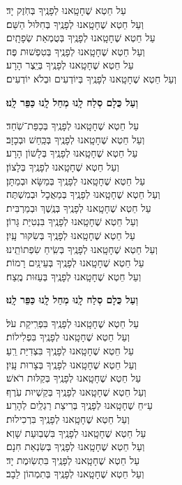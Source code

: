 \documentclass[twoside, openany, parskip=half, 11pt]{book}
\begin{document}
עַל חֵטְא שֶׁחָטָֽאנוּ לְפָנֶֽיךָ בְּחֹֽזֶק יָד׃ \\ וְעַל חֵטְא שֶׁחָטָֽאנוּ לְפָנֶֽיךָ בְּחִלּוּל הַשֵּׁם׃ \\
עַל חֵטְא שֶׁחָטָֽאנוּ לְפָנֶֽיךָ בְּטֻמְאַת שְׂפָתָֽיִם׃ \\ וְעַל חֵטְא שֶׁחָטָֽאנוּ לְפָנֶֽיךָ בְּטִפְשׁוּת פֶּה׃ \\
עַל חֵטְא שֶׁחָטָֽאנוּ לְפָנֶֽיךָ בְּיֵֽצֶר הָרָע׃ \\ וְעַל חֵטְא שֶׁחָטָֽאנוּ לְפָנֶֽיךָ בְּיוֹדְעִים וּבְלֹא יוֹדְעִים׃

\textbf{וְעַל כֻּלָם סְלַח לָֽנוּ מְחַל לָֽנוּ כַּפֵּר לָֽנוּ׃}

עַל חֵטְא שֶׁחָטָֽאנוּ לְפָנֶֽיךָ בְּכַפַּת־שֹֽׁחַד׃ \\ וְעַל חֵטְא שֶׁחָטָֽאנוּ לְפָנֶֽיךָ בְּכַּֽחַשׁ וּבְכָזָב׃ \\
עַל חֵטְא שֶׁחָטָֽאנוּ לְפָנֶֽיךָ בְּלָשׁוֹן הָרָע׃\\ וְעַל חֵטְא שֶׁחָטָֽאנוּ לְפָנֶֽיךָ בְּלָצוֹן׃\\
עַל חֵטְא שֶׁחָטָֽאנוּ לְפָנֶֽיךָ בְּמַשָּׂא וּבְמַתָּן׃ \\ וְעַל חֵטְא שֶׁחָטָֽאנוּ לְפָנֶֽיךָ בְּמַאֲכׇל וּבְמִשְׁתֶּה׃\\
עַל חֵטְא שֶׁחָטָֽאנוּ לְפָנֶֽיךָ בְּנֶֽשֶׁךְ וּבְמַרְבִּית׃\\ וְעַל חֵטְא שֶׁחָטָֽאנוּ לְפָנֶֽיךָ בִּנְטִיַּת גָּרוֹן׃ \\
עַל חֵטְא שֶׁחָטָֽאנוּ לְפָנֶֽיךָ בְּשִׂקּוּר עָֽיִן׃\\ וְעַל חֵטְא שֶׁחָטָֽאנוּ לְפָנֶֽיךָ בְּשִֽׂיחַ שִׂפְתוֹתֵֽינוּ׃ \\
עַל חֵטְא שֶׁחָטָֽאנוּ לְפָנֶֽיךָ בְּעֵינַֽיִם רָמוֹת׃\\ וְעַל חֵטְא שֶׁחָטָֽאנוּ לְפָנֶֽיךָ בְּעַזּוּת מֶֽצַח׃

\textbf{וְעַל כֻּלָם סְלַח לָֽנוּ מְחַל לָֽנוּ כַּפֵּר לָֽנוּ׃}

עַל חֵטְא שֶׁחָטָֽאנוּ לְפָנֶֽיךָ בִּפְרִֽיקַת עֹל׃\\ וְעַל חֵטְא שֶׁחָטָֽאנוּ לְפָנֶֽיךָ בִּפְלִילוֹת׃ \\
עַל חֵטְא שֶׁחָטָֽאנוּ לְפָנֶֽיךָ בִּצְדִיַּת רֵֽעַ׃ \\ וְעַל חֵטְא שֶׁחָטָֽאנוּ לְפָנֶֽיךָ בְּצָרוּת עָֽיִן׃ \\
עַל חֵטְא שֶׁחָטָֽאנוּ לְפָנֶֽיךָ בְּקַלּוּת רֹאשׁ׃\\ וְעַל חֵטְא שֶׁחָטָֽאנוּ לְפָנֶֽיךָ בְּקַשְׁיוּת עֹֽרֶף׃ \\
עַ״חֵ שֶׁחָטָֽאנוּ לְפָנֶֽיךָ בְּרִיצַת רַגְלַֽיִם לְהָרַע׃\\ וְעַל חֵטְא שֶׁחָטָֽאנוּ לְפָנֶֽיךָ בִּרְכִילוּת׃ \\
עַל חֵטְא שֶׁחָטָֽאנוּ לְפָנֶֽיךָ בִּשְׁבֽוּעַת שָׁוְא׃ \\ וְעַל חֵטְא שֶׁחָטָֽאנוּ לְפָנֶֽיךָ בְּשִׂנְאַת חִנָם׃ \\
עַל חֵטְא שֶׁחָטָֽאנוּ לְפָנֶֽיךָ בִּתְשֽׂוּמֶת יָד׃\\ וְעַל חֵטְא שֶׁחָטָֽאנוּ לְפָנֶֽיךָ בְּתִמְהוֹן לֵבָב׃
\end{document}
